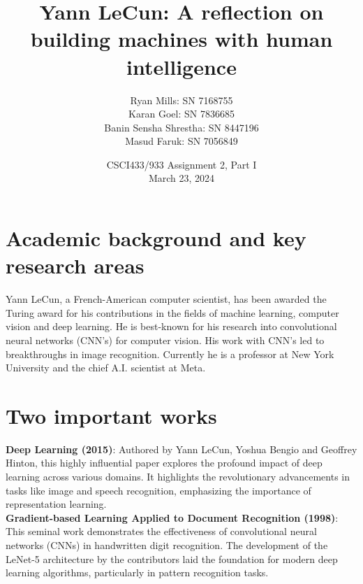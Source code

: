\documentclass[a4paper,11pt]{article}
\title{Yann LeCun: A reflection on building machines with human intelligence}
\author{
    Ryan Mills: SN 7168755\\
    Karan Goel: SN 7836685\\
    Banin Sensha Shrestha: SN 8447196\\
    Masud Faruk: SN 7056849\\
}
\date{CSCI433/933 Assignment 2, Part I\\
March 23, 2024}
\begin{document}
\maketitle
\newpage
\section{Academic background and key research areas}
\label{sec:introduction}
Yann LeCun, a French-American computer scientist, has been awarded the Turing award for his contributions in the fields of machine learning, computer vision and deep learning. He is best-known for his research into convolutional neural networks (CNN's) for computer vision. His work with CNN’s led to breakthroughs in image recognition. Currently he is a professor at New York University and the chief A.I. scientist at Meta. \cite{lecunYannLeCunaposs} 

\section{Two important works}
\textbf{Deep Learning (2015)}: Authored by Yann LeCun, Yoshua Bengio and Geoffrey Hinton, this highly influential paper explores the profound impact of deep learning across various domains. It highlights the revolutionary advancements in tasks like image and speech recognition, emphasizing the importance of representation learning. \\
\textbf{Gradient-based Learning Applied to Document Recognition (1998)}: This seminal work demonstrates the effectiveness of convolutional neural networks (CNNs) in handwritten digit recognition. The development of the LeNet-5 architecture by the contributors laid the foundation for modern deep learning algorithms, particularly in pattern recognition tasks.
\end{document}
